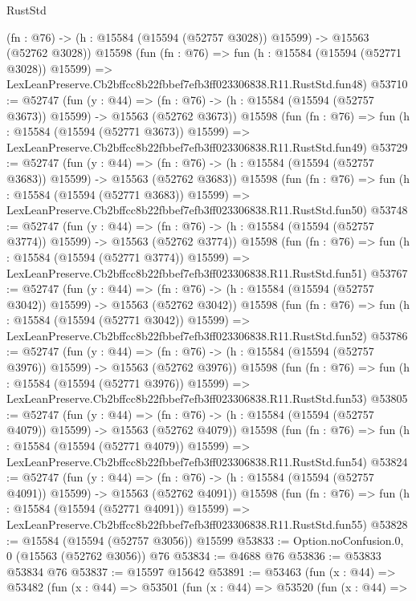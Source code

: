 \begin{lexlean}{RustStd}
\begin{coremodule}
    (fn : @76) -> (h : @15584 (@15594 (@52757 @3028)) @15599) -> @15563 (@52762 @3028))
    @15598
    (fun (fn : @76) =>
    fun (h : @15584 (@15594 (@52771 @3028)) @15599) =>
    LexLeanPreserve.Cb2bffcc8b22fbbef7efb3ff023306838.R11.RustStd.fun48)
@53710 := @52747
    (fun (y : @44) =>
    (fn : @76) -> (h : @15584 (@15594 (@52757 @3673)) @15599) -> @15563 (@52762 @3673))
    @15598
    (fun (fn : @76) =>
    fun (h : @15584 (@15594 (@52771 @3673)) @15599) =>
    LexLeanPreserve.Cb2bffcc8b22fbbef7efb3ff023306838.R11.RustStd.fun49)
@53729 := @52747
    (fun (y : @44) =>
    (fn : @76) -> (h : @15584 (@15594 (@52757 @3683)) @15599) -> @15563 (@52762 @3683))
    @15598
    (fun (fn : @76) =>
    fun (h : @15584 (@15594 (@52771 @3683)) @15599) =>
    LexLeanPreserve.Cb2bffcc8b22fbbef7efb3ff023306838.R11.RustStd.fun50)
@53748 := @52747
    (fun (y : @44) =>
    (fn : @76) -> (h : @15584 (@15594 (@52757 @3774)) @15599) -> @15563 (@52762 @3774))
    @15598
    (fun (fn : @76) =>
    fun (h : @15584 (@15594 (@52771 @3774)) @15599) =>
    LexLeanPreserve.Cb2bffcc8b22fbbef7efb3ff023306838.R11.RustStd.fun51)
@53767 := @52747
    (fun (y : @44) =>
    (fn : @76) -> (h : @15584 (@15594 (@52757 @3042)) @15599) -> @15563 (@52762 @3042))
    @15598
    (fun (fn : @76) =>
    fun (h : @15584 (@15594 (@52771 @3042)) @15599) =>
    LexLeanPreserve.Cb2bffcc8b22fbbef7efb3ff023306838.R11.RustStd.fun52)
@53786 := @52747
    (fun (y : @44) =>
    (fn : @76) -> (h : @15584 (@15594 (@52757 @3976)) @15599) -> @15563 (@52762 @3976))
    @15598
    (fun (fn : @76) =>
    fun (h : @15584 (@15594 (@52771 @3976)) @15599) =>
    LexLeanPreserve.Cb2bffcc8b22fbbef7efb3ff023306838.R11.RustStd.fun53)
@53805 := @52747
    (fun (y : @44) =>
    (fn : @76) -> (h : @15584 (@15594 (@52757 @4079)) @15599) -> @15563 (@52762 @4079))
    @15598
    (fun (fn : @76) =>
    fun (h : @15584 (@15594 (@52771 @4079)) @15599) =>
    LexLeanPreserve.Cb2bffcc8b22fbbef7efb3ff023306838.R11.RustStd.fun54)
@53824 := @52747
    (fun (y : @44) =>
    (fn : @76) -> (h : @15584 (@15594 (@52757 @4091)) @15599) -> @15563 (@52762 @4091))
    @15598
    (fun (fn : @76) =>
    fun (h : @15584 (@15594 (@52771 @4091)) @15599) =>
    LexLeanPreserve.Cb2bffcc8b22fbbef7efb3ff023306838.R11.RustStd.fun55)
@53828 := @15584 (@15594 (@52757 @3056)) @15599
@53833 := Option.noConfusion.{0, 0} (@15563 (@52762 @3056)) @76
@53834 := @4688 @76
@53836 := @53833 @53834 @76
@53837 := @15597 @15642
@53891 := @53463
    (fun (x : @44) =>
    @53482
      (fun (x : @44) =>
      @53501
        (fun (x : @44) =>
        @53520
          (fun (x : @44) =>

\end{coremodule}
\end{lexlean}
